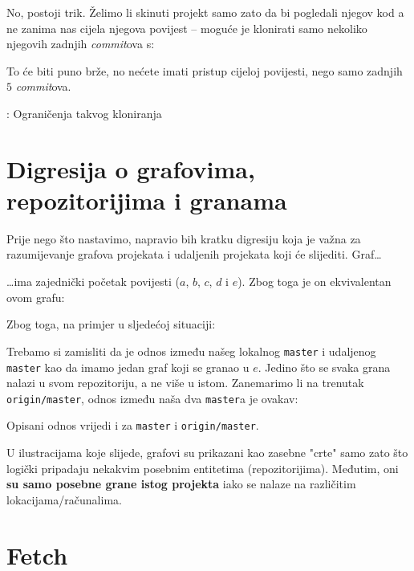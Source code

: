 No, postoji trik.
Želimo li skinuti projekt samo zato da bi pogledali njegov kod a ne zanima nas cijela njegova povijest -- moguće je klonirati samo nekoliko njegovih zadnjih \emph{commit}ova s:


To će biti puno brže, no nećete imati pristup cijeloj povijesti, nego samo zadnjih $5$ \emph{commit}ova.

\TODO: Ograničenja takvog kloniranja

\section*{Digresija o grafovima, repozitorijima i granama}

Prije nego što nastavimo, napravio bih kratku digresiju koja je važna za razumijevanje grafova projekata i udaljenih projekata koji će slijediti.
Graf\dots



\dots{}ima zajednički početak povijesti ($a$, $b$, $c$, $d$ i $e$).
Zbog toga je on ekvivalentan ovom grafu:



Zbog toga, na primjer u sljedećoj situaciji:



Trebamo si zamisliti da je odnos između našeg lokalnog \verb+master+ i udaljenog \verb+master+ kao da imamo jedan graf koji se granao u $e$. Jedino što se svaka grana nalazi u svom repozitoriju, a ne više u istom.
Zanemarimo li na trenutak \verb+origin/master+, odnos između naša dva \verb+master+a je ovakav:



Opisani odnos vrijedi i za \verb+master+ i \verb+origin/master+.

U ilustracijama koje slijede, grafovi su prikazani kao zasebne "crte" samo zato što logički pripadaju nekakvim posebnim entitetima (repozitorijima).
Međutim, oni \textbf{su samo posebne grane istog projekta} iako se nalaze na različitim lokacijama/računalima.

\section*{Fetch}


